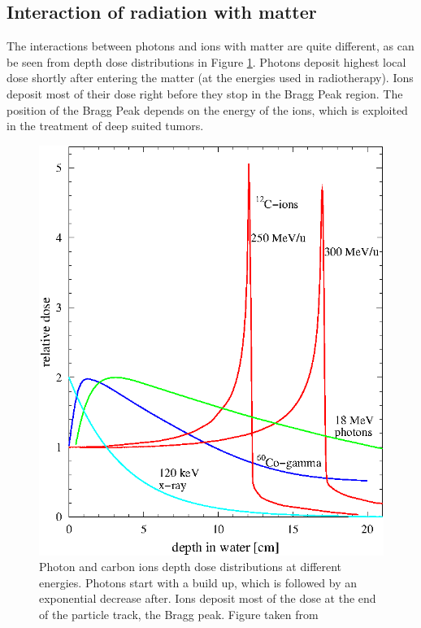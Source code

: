 \documentclass[type=dr, dr=rernat, accentcolor=tud7b,colorbacktitle, bigchapter, openright, twoside, 12pt ]{tudthesis}
\begin{document}
\subsection{Interaction of radiation with matter}

The interactions between photons and ions with matter are quite different, as can be seen from depth dose distributions in Figure \ref{ddp}.  Photons deposit highest local dose shortly after entering the matter 
(at the energies used in radiotherapy). Ions deposit most of their dose right before they stop in the Bragg Peak region. The position of the Bragg Peak depends on the energy of the ions, which is exploited in the treatment
of deep suited tumors.

\newpage
 
\vspace*{1cm}
 
\begin{figure}[H]
\begin{center}
\includegraphics[scale=1]{./Images/depthdose.png}
\caption{Photon and carbon ions depth dose distributions at different energies. Photons start with a build up, which is followed by an exponential decrease after.
Ions deposit most of the dose at the end of the particle track, the Bragg peak. Figure taken from \cite{Schardt2010} }
\label{ddp}
\end{center}
\end{figure}
\end{document}
